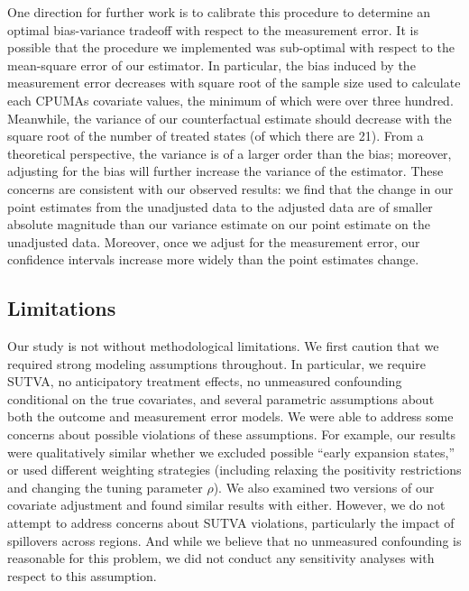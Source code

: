 \documentclass[article]{imsart}
\theoremstyle{plain}
\theoremstyle{remark}
\begin{document}
One direction for further work is to calibrate this procedure to determine an optimal bias-variance tradeoff with respect to the measurement error. It is possible that the procedure we implemented was sub-optimal with respect to the mean-square error of our estimator. In particular, the bias induced by the measurement error decreases with square root of the sample size used to calculate each CPUMAs covariate values, the minimum of which were over three hundred. Meanwhile, the variance of our counterfactual estimate should decrease with the square root of the number of treated states (of which there are 21). From a theoretical perspective, the variance is of a larger order than the bias; moreover, adjusting for the bias will further increase the variance of the estimator. These concerns are consistent with our observed results: we find that the change in our point estimates from the unadjusted data to the adjusted data are of smaller absolute magnitude than our variance estimate on our point estimate on the unadjusted data. Moreover, once we adjust for the measurement error, our confidence intervals increase more widely than the point estimates change.

\subsection{Limitations}

Our study is not without methodological limitations. We first caution that we required strong modeling assumptions throughout. In particular, we require SUTVA, no anticipatory treatment effects, no unmeasured confounding conditional on the true covariates, and several parametric assumptions about both the outcome and measurement error models. We were able to address some concerns about possible violations of these assumptions. For example, our results were qualitatively similar whether we excluded possible ``early expansion states,'' or used different weighting strategies (including relaxing the positivity restrictions and changing the tuning parameter $\rho$). We also examined two versions of our covariate adjustment and found similar results with either. However, we do not attempt to address concerns about SUTVA violations, particularly the impact of spillovers across regions. And while we believe that no unmeasured confounding is reasonable for this problem, we did not conduct any sensitivity analyses with respect to this assumption.
\end{document}
